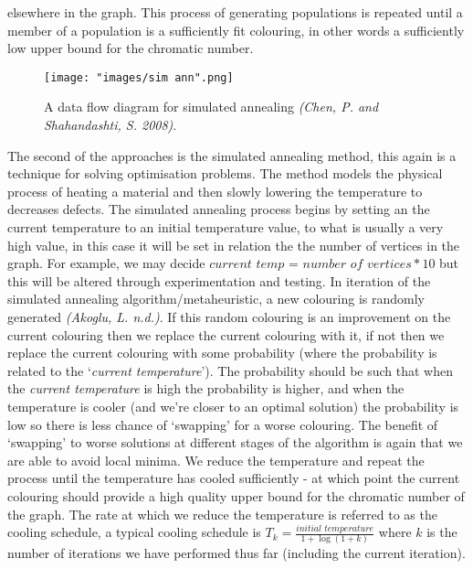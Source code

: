 \documentclass[12pt,a4paper]{article}
\begin{document}
elsewhere in the graph. This process of generating populations is repeated until a member of a population is a sufficiently fit colouring, in other words a sufficiently low upper bound for the chromatic number. 
\begin{wrapfigure}{h}{0.6\textwidth}
\centering
\texttt{[image: "images/sim ann".png]}
\caption{A data flow diagram for simulated annealing \textit{(Chen, P. and Shahandashti, S. 2008)}.}
\label{fig:simann}
\end{wrapfigure}

\par The second of the approaches is the simulated annealing method, this again is a technique for solving optimisation problems. The method models the physical process of heating a material and then slowly lowering the temperature to decreases defects. The simulated annealing process begins by setting an the current temperature to an initial temperature value, to what is usually a very high value, in this case it will be set in relation the the number of vertices in the graph. For example, we may decide $\textit{current temp = number of vertices} * 10$ but this will be altered through experimentation and testing. In iteration of the simulated annealing algorithm/metaheuristic, a new colouring is randomly generated \textit{(Akoglu, L. n.d.)}. If this random colouring is an improvement on the current colouring then we replace the current colouring with it, if not then we replace the current colouring with some probability (where the probability is related to the `\textit{current temperature}'). The probability should be such that when the \textit{current temperature} is high the probability is higher, and when the temperature is cooler (and we're closer to an optimal solution) the probability is low so there is less chance of `swapping' for a worse colouring. The benefit of `swapping' to worse solutions at different stages of the algorithm is again that we are able to avoid local minima. We reduce the temperature and repeat the process until the temperature has cooled sufficiently - at which point the current colouring should provide a high quality upper bound for the chromatic number of the graph. The rate at which we reduce the temperature is referred to as the cooling schedule, a typical cooling schedule is $T_k = \frac{\textit{initial temperature}}{1 + \log(1+k)}$ where $k$ is the number of iterations we have performed thus far (including the current iteration).
\end{document}
